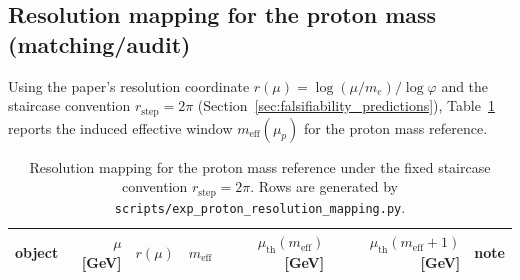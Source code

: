 \subsection{Resolution mapping for the proton mass (matching/audit)}
\label{subsec:proton_resolution_mapping}
\MatchTag Using the paper's resolution coordinate $r(\mu)=\log(\mu/m_e)/\log\varphi$ and the staircase convention $r_{\mathrm{step}}=2\pi$ (Section~\ref{sec:falsifiability_predictions}), Table~\ref{tab:proton_resolution_mapping} reports the induced effective window $m_{\mathrm{eff}}(\mu_p)$ for the proton mass reference.

\AuditTag %

\begin{table}[t]
\centering
\small
\setlength{\tabcolsep}{7pt}
\renewcommand{\arraystretch}{1.15}
\begin{tabular}{lrrrrrl}
\toprule
object & $\mu$ [GeV] & $r(\mu)$ & $m_{\mathrm{eff}}$ & $\mu_{\mathrm{th}}(m_{\mathrm{eff}})$ [GeV] & $\mu_{\mathrm{th}}(m_{\mathrm{eff}}+1)$ [GeV] & note \\
\midrule
%
\end{tabular}
\caption{Resolution mapping for the proton mass reference under the fixed staircase convention $r_{\mathrm{step}}=2\pi$. Rows are generated by \texttt{scripts/exp\_proton\_resolution\_mapping.py}.}
\label{tab:proton_resolution_mapping}
\end{table}
